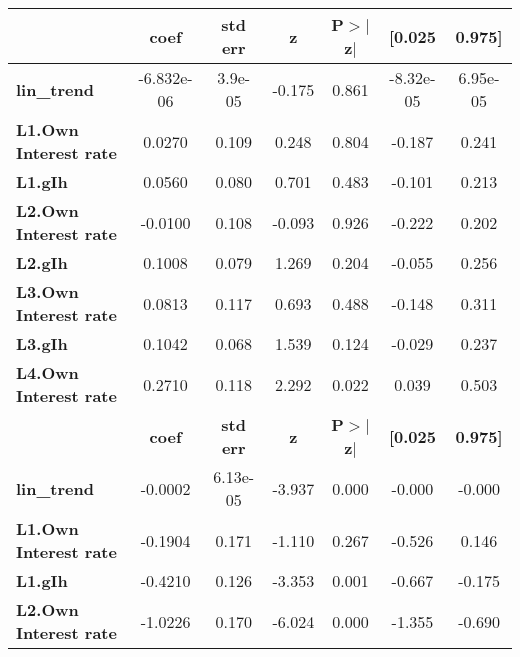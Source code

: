 \begin{center}
\begin{tabular}{lcccccc}
\toprule
                              & \textbf{coef} & \textbf{std err} & \textbf{z} & \textbf{P$> |$z$|$} & \textbf{[0.025} & \textbf{0.975]}  \\
\midrule
\textbf{lin\_trend}           &   -6.832e-06  &      3.9e-05     &    -0.175  &         0.861        &    -8.32e-05    &     6.95e-05     \\
\textbf{L1.Own Interest rate} &       0.0270  &        0.109     &     0.248  &         0.804        &       -0.187    &        0.241     \\
\textbf{L1.gIh}               &       0.0560  &        0.080     &     0.701  &         0.483        &       -0.101    &        0.213     \\
\textbf{L2.Own Interest rate} &      -0.0100  &        0.108     &    -0.093  &         0.926        &       -0.222    &        0.202     \\
\textbf{L2.gIh}               &       0.1008  &        0.079     &     1.269  &         0.204        &       -0.055    &        0.256     \\
\textbf{L3.Own Interest rate} &       0.0813  &        0.117     &     0.693  &         0.488        &       -0.148    &        0.311     \\
\textbf{L3.gIh}               &       0.1042  &        0.068     &     1.539  &         0.124        &       -0.029    &        0.237     \\
\textbf{L4.Own Interest rate} &       0.2710  &        0.118     &     2.292  &         0.022        &        0.039    &        0.503     \\
                              & \textbf{coef} & \textbf{std err} & \textbf{z} & \textbf{P$> |$z$|$} & \textbf{[0.025} & \textbf{0.975]}  \\
\midrule
\textbf{lin\_trend}           &      -0.0002  &     6.13e-05     &    -3.937  &         0.000        &       -0.000    &       -0.000     \\
\textbf{L1.Own Interest rate} &      -0.1904  &        0.171     &    -1.110  &         0.267        &       -0.526    &        0.146     \\
\textbf{L1.gIh}               &      -0.4210  &        0.126     &    -3.353  &         0.001        &       -0.667    &       -0.175     \\
\textbf{L2.Own Interest rate} &      -1.0226  &        0.170     &    -6.024  &         0.000        &       -1.355    &       -0.690     \\

\end{tabular}
\end{center}
